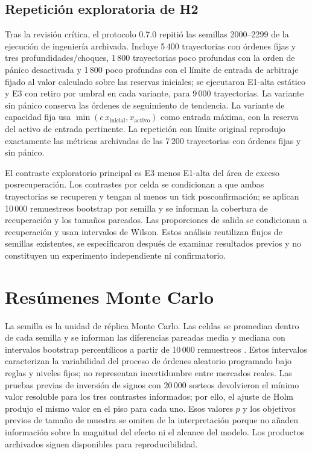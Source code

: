 \subsection{Repetición exploratoria de H2}
\label{sec:h2-replay-method}

Tras la revisión crítica, el protocolo 0.7.0 repitió las semillas 2000--2299 de la ejecución de ingeniería archivada. Incluye 5\,400 trayectorias con órdenes fijas y tres profundidades/choques, 1\,800 trayectorias poco profundas con la orden de pánico desactivada y 1\,800 poco profundas con el límite de entrada de arbitraje fijado al valor calculado sobre las reservas iniciales; se ejecutaron E1-alta estático y E3 con retiro por umbral en cada variante, para 9\,000 trayectorias. La variante sin pánico conserva las órdenes de seguimiento de tendencia. La variante de capacidad fija usa $\min(c\,x_{\mathrm{inicial}},x_{\mathrm{activo}})$ como entrada máxima, con la reserva del activo de entrada pertinente. La repetición con límite original reprodujo exactamente las métricas archivadas de las 7\,200 trayectorias con órdenes fijas y sin pánico.

El contraste exploratorio principal es E3 menos E1-alta del área de exceso posrecuperación. Los contrastes por celda se condicionan a que ambas trayectorias se recuperen y tengan al menos un tick posconfirmación; se aplican 10\,000 remuestreos bootstrap por semilla y se informan la cobertura de recuperación y los tamaños pareados. Las proporciones de salida se condicionan a recuperación y usan intervalos de Wilson. Estos análisis reutilizan flujos de semillas existentes, se especificaron después de examinar resultados previos y no constituyen un experimento independiente ni confirmatorio.

\section{Resúmenes Monte Carlo}
\label{sec:analisis-estadistico}

La semilla es la unidad de réplica Monte Carlo. Las celdas se promedian dentro de cada semilla y se informan las diferencias pareadas media y mediana con intervalos bootstrap percentílicos a partir de 10\,000 remuestreos \cite{efron1979bootstrap}. Estos intervalos caracterizan la variabilidad del proceso de órdenes aleatorio programado bajo reglas y niveles fijos; no representan incertidumbre entre mercados reales. Las pruebas previas de inversión de signos con 20\,000 sorteos devolvieron el mínimo valor resoluble para los tres contrastes informados; por ello, el ajuste de Holm produjo el mismo valor en el piso para cada uno. Esos valores $p$ y los objetivos previos de tamaño de muestra se omiten de la interpretación porque no añaden información sobre la magnitud del efecto ni el alcance del modelo. Los productos archivados siguen disponibles para reproducibilidad.

